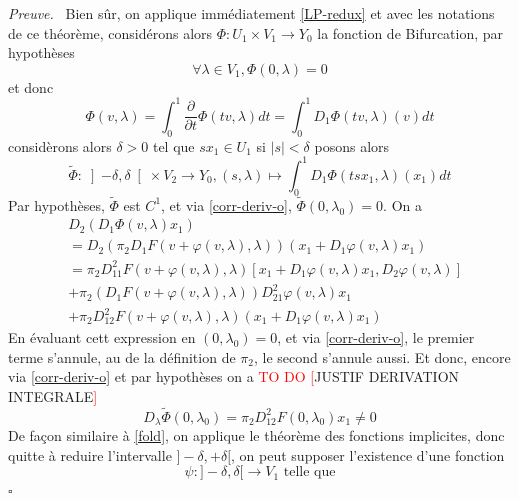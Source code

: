 \documentclass[a4paper,12pt,oneside,titlepage]{article}
\renewcommand{\tilde}[1]{\widetilde{#1}}
\newcommand{\todo}[1]{\textcolor{red}{TO DO [}#1\textcolor{red}{]}}
\theoremstyle{definition}
\theoremstyle{plain}
\newenvironment{preuve}
{\par\noindent\textit{Preuve.}\ }
{\hfill$\square$\par}
\begin{document}
\begin{preuve}
    Bien sûr, on applique immédiatement \ref{LP-redux} et avec les notations de ce théorème, considérons alors $\Phi: U_1\times V_1\rightarrow Y_0$ la fonction de Bifurcation, par hypothèses
    \begin{equation*}
        \forall \lambda\in V_1 ,\Phi(0,\lambda)=0
    \end{equation*}
    et donc
    \begin{equation*}
        \Phi(v,\lambda)=\int_0^1 \frac{\partial}{\partial t} \Phi(tv,\lambda)dt=\int_0^1 D_1\Phi(tv,\lambda)(v) dt
    \end{equation*}
    considèrons alors $\delta>0$ tel que $sx_1\in U_1$ si $|s|<\delta$ posons alors
    \begin{equation*}
        \tilde{\Phi}:\left] -\delta,\delta \right[\times V_2\rightarrow Y_0,(s,\lambda)\mapsto \int_0^1 D_1\Phi(tsx_1,\lambda)(x_1) dt
    \end{equation*}
    Par hypothèses, $\tilde{\Phi}$ est $C^1$, et via \ref{corr-deriv-o}, $\tilde{\Phi}(0,\lambda_0)=0$.
    On a 
    \begin{align*}
        &D_{2}(D_1 \Phi(v,\lambda)x_1)\\
        &= D_{2}(\pi_2 D_1 F(v+\varphi(v,\lambda),\lambda))(x_1+ D_1\varphi(v,\lambda)x_1)\\
        &=\pi_2 D^2_{11}F(v+\varphi(v,\lambda),\lambda) [x_1+D_1\varphi(v,\lambda)x_1,D_2\varphi(v,\lambda)]\\
        &+\pi_2(D_1 F(v+\varphi(v,\lambda),\lambda))D^2_{21}\varphi(v,\lambda)x_1\\
        &+\pi_2 D^2_{12}F(v+\varphi(v,\lambda),\lambda)(x_1+D_1\varphi(v,\lambda)x_1)
    \end{align*}
    En évaluant cett expression en $(0,\lambda_0)=0$, et via \ref{corr-deriv-o}, le premier terme s'annule,  au de la définition de $\pi_2$, le second s'annule aussi. Et donc, encore via \ref{corr-deriv-o} et par hypothèses on a \todo{JUSTIF DERIVATION INTEGRALE}
    \begin{equation*}
        D_{\lambda}\tilde{\Phi}(0,\lambda_0)=\pi_2 D^2_{12}F(0,\lambda_0)x_1\neq 0
    \end{equation*}
    De façon similaire à \ref{fold}, on applique le théorème des fonctions implicites, donc quitte à reduire l'intervalle $]-\delta,+\delta[$, on peut supposer l'existence d'une fonction 
        \begin{equation*}
        \psi : ]-\delta,\delta [\rightarrow V_1\text{ telle que} 

\end{equation*}
\end{preuve}
\end{document}
